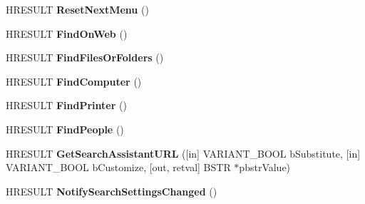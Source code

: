 \begin{DoxyCompactItemize}
\mbox{\label{interface_s_h_doc_vw_1_1_i_search_assistant_o_c_a78dd2864c538226443e636764224a90a}} 
H\+R\+E\+S\+U\+LT {\bfseries Reset\+Next\+Menu} ()
\item 
\mbox{\label{interface_s_h_doc_vw_1_1_i_search_assistant_o_c_a814e6470cb25a98cd50aa90a69b8f1c8}} 
H\+R\+E\+S\+U\+LT {\bfseries Find\+On\+Web} ()
\item 
\mbox{\label{interface_s_h_doc_vw_1_1_i_search_assistant_o_c_a404073cd8133dfeb41a993ed283b5638}} 
H\+R\+E\+S\+U\+LT {\bfseries Find\+Files\+Or\+Folders} ()
\item 
\mbox{\label{interface_s_h_doc_vw_1_1_i_search_assistant_o_c_a0b1e3ce5e8381849e772844518058273}} 
H\+R\+E\+S\+U\+LT {\bfseries Find\+Computer} ()
\item 
\mbox{\label{interface_s_h_doc_vw_1_1_i_search_assistant_o_c_a16945b15cdfbff23099dffc014dab1b4}} 
H\+R\+E\+S\+U\+LT {\bfseries Find\+Printer} ()
\item 
\mbox{\label{interface_s_h_doc_vw_1_1_i_search_assistant_o_c_a6b8f94a80db407eb01c87ec36434bf58}} 
H\+R\+E\+S\+U\+LT {\bfseries Find\+People} ()
\item 
\mbox{\label{interface_s_h_doc_vw_1_1_i_search_assistant_o_c_adc8b34fd76cc9343c47fea8482247629}} 
H\+R\+E\+S\+U\+LT {\bfseries Get\+Search\+Assistant\+U\+RL} (\mbox{[}in\mbox{]} V\+A\+R\+I\+A\+N\+T\+\_\+\+B\+O\+OL b\+Substitute, \mbox{[}in\mbox{]} V\+A\+R\+I\+A\+N\+T\+\_\+\+B\+O\+OL b\+Customize, \mbox{[}out, retval\mbox{]} B\+S\+TR $\ast$pbstr\+Value)
\item 
\mbox{\label{interface_s_h_doc_vw_1_1_i_search_assistant_o_c_a412697430f6d7c8f326a2322fb4035e9}} 
H\+R\+E\+S\+U\+LT {\bfseries Notify\+Search\+Settings\+Changed} ()
\item 
\mbox{\label{interface_s_h_doc_vw_1_1_i_search_assistant_o_c_a05aef675eae7ab85860c7bbbec631fb9}} 

\end{DoxyCompactItemize}
